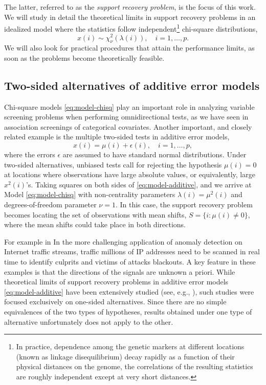 The latter, referred to as the \emph{support recovery problem}, is the focus of this work.
We will study in detail the theoretical limits in support recovery problems in an idealized model where the statistics follow independent\footnote{In practice, dependence among the genetic markers at different locations (known as linkage disequilibrium) decay rapidly as a function of their physical distances on the genome, the correlations of the resulting statistics are roughly independent except at very short distances.} chi-square distributions,
\begin{equation} \label{eq:model-chisq}
    x(i) \sim \chi_\nu^2\left(\lambda(i)\right), \quad i=1,\ldots,p.
\end{equation}
We will also look for practical procedures that attain the performance limits, as soon as the problems become theoretically feasible.


\subsection{Two-sided alternatives of additive error models}
\label{subsec:motivation-additive}

Chi-square models \eqref{eq:model-chisq} play an important role in analyzing variable screening problems when performing omnidirectional tests, as we have seen in association screenings of categorical covariates.
Another important, and closely related example is the multiple two-sided tests in additive error models,
\begin{equation} \label{eq:model-additive}
    x(i) = \mu(i) + \epsilon(i), \quad i=1,\ldots,p,
\end{equation}
where the errors $\epsilon$ are assumed to have standard normal distributions.
Under two-sided alternatives, unbiased tests call for rejecting the hypothesis $\mu(i)=0$ at locations where observations have large absolute values, or equivalently, large $x^2(i)$'s.
Taking squares on both sides of \eqref{eq:model-additive}, and we arrive at Model \eqref{eq:model-chisq} with non-centrality parameters $\lambda(i) = \mu^2(i)$ and degrees-of-freedom parameter $\nu =1$.
In this case, the support recovery problem becomes locating the set of observations with mean shifts, $S=\{i:\mu(i)\neq 0\}$, where the mean shifts could take place in both directions.

For example in 
In the more challenging application of anomaly detection on Internet traffic streams, traffic millions of IP addresses need to be scanned in real time to identify culprits and victims of attacks blackouts.
A key feature in these examples is that the directions of the signals are unknown a priori.
While theoretical limits of support recovery problems in additive error models \eqref{eq:model-additive} have been extensively studied (see, e.g., \cite{arias2017distribution, butucea2018variable, gao2018fundamental}), such studies were focused exclusively on one-sided alternatives.
Since there are no simple equivalences of the two types of hypotheses, results obtained under one type of alternative unfortunately does not apply to the other.

